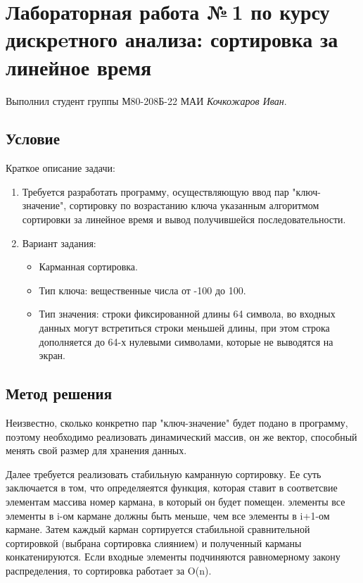 \documentclass[12pt]{article}
\begin{document}
\section*{Лабораторная работа №\,1 по курсу дискрeтного анализа: сортировка за линейное время}

Выполнил студент группы М80-208Б-22 МАИ \textit{Кочкожаров Иван}.

\subsection*{Условие}

Краткое описание задачи:
\begin{enumerate}
\item
    Требуется разработать программу, осуществляющую ввод пар "ключ-значение", сортировку по возрастанию ключа указанным алгоритмом сортировки за линейное время и вывод получившейся последовательности.
\item
    Вариант задания:
        \begin{itemize}
            \item Карманная сортировка.
            \item Тип ключа: вещественные числа от -100 до 100.
            \item Тип значения: строки фиксированной длины 64 символа, во входных данных могут встретиться строки меньшей длины, при этом строка дополняется до 64-х нулевыми символами, которые не выводятся на экран.
        \end{itemize}
\end{enumerate}

\subsection*{Метод решения}

Неизвестно, сколько конкретно пар "ключ-значение" будет подано в программу, поэтому необходимо реализовать динамический массив, он же вектор, способный менять свой размер для хранения данных.
\par Далее требуется реализовать стабильную камранную сортировку. Ее суть заключается в том, что определяеятся функция, которая ставит в соответсвие элементам массива номер кармана, в который он будет помещен.
элементы все элементы в i-ом кармане должны быть меньше, чем все элементы в i+1-ом кармане. Затем каждый карман сортируется стабильной сравнительной сортировкой (выбрана сортировка слиянием) и полученный карманы конкатенируются.
Если входные элементы подчиняются равномерному закону распределения, то сортировка работает за O(n).
\end{document}
